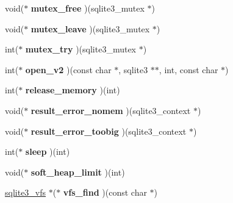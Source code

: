 \begin{DoxyCompactItemize}
void($\ast$ {\bfseries mutex\+\_\+free} )(sqlite3\+\_\+mutex $\ast$)
\item 
\mbox{\label{structsqlite3__api__routines_ae599184431cf669551ae88f4ca7373c0}} 
void($\ast$ {\bfseries mutex\+\_\+leave} )(sqlite3\+\_\+mutex $\ast$)
\item 
\mbox{\label{structsqlite3__api__routines_a04b95233a9977a34ff0f2d9fab44e507}} 
int($\ast$ {\bfseries mutex\+\_\+try} )(sqlite3\+\_\+mutex $\ast$)
\item 
\mbox{\label{structsqlite3__api__routines_ac6da992cdbb490e1d1e856a4864851bf}} 
int($\ast$ {\bfseries open\+\_\+v2} )(const char $\ast$, sqlite3 $\ast$$\ast$, int, const char $\ast$)
\item 
\mbox{\label{structsqlite3__api__routines_a2dbb78dde331812425108d9eaeba7bf1}} 
int($\ast$ {\bfseries release\+\_\+memory} )(int)
\item 
\mbox{\label{structsqlite3__api__routines_abaccd85342d77c068d05de2b9cd9c7e0}} 
void($\ast$ {\bfseries result\+\_\+error\+\_\+nomem} )(sqlite3\+\_\+context $\ast$)
\item 
\mbox{\label{structsqlite3__api__routines_acc888c07a82710c1f0c791ba3058c44c}} 
void($\ast$ {\bfseries result\+\_\+error\+\_\+toobig} )(sqlite3\+\_\+context $\ast$)
\item 
\mbox{\label{structsqlite3__api__routines_ae7d2a4258889ab0de44cfce3a9f4b02b}} 
int($\ast$ {\bfseries sleep} )(int)
\item 
\mbox{\label{structsqlite3__api__routines_a217004dbd021cb40d5ad24f963c68451}} 
void($\ast$ {\bfseries soft\+\_\+heap\+\_\+limit} )(int)
\item 
\mbox{\label{structsqlite3__api__routines_af5a58d375949a32ad547ee170a3e8b6d}} 
\hyperlink{structsqlite3__vfs}{sqlite3\+\_\+vfs} $\ast$($\ast$ {\bfseries vfs\+\_\+find} )(const char $\ast$)
\item 
\mbox{\label{structsqlite3__api__routines_a0bc5bcc67851f8ceab8114b89f59328d}} 
$$
\end{DoxyCompactItemize}
